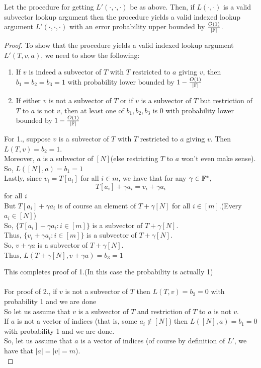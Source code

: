 \begin{lemma}\label{lem:reduction}
Let the procedure for getting $L'(\cdot, \cdot, \cdot)$ be as above. Then, if $L(\cdot, \cdot)$ is a valid subvector lookup argument then the procedure yields a valid indexed lookup argument $L'(\cdot, \cdot, \cdot)$ with an error probability upper bounded by $\frac{O(1)}{|\mathbb{F}|}$.
\end{lemma}

\begin{proof}
    To show that the procedure yields a valid indexed lookup argument $L'(T, v, a)$, we need to show the following:
    \begin{enumerate}

        \item If $v$ is indeed a subvector of $T$ with $T$ restricted to $a$ giving $v$, then $b_1=b_2=b_3=1$ with probability lower bounded by $1-\frac{O(1)}{|\mathbb{F}|}$
        \item If either $v$ is not a subvector of $T$ or if $v$ is a subvector of $T$ but restriction of $T$ to $a$ is not $v$, then at least one of $b_1, b_2, b_3$ is $0$ with probability lower bounded by $1-\frac{O(1)}{|\mathbb{F}|}$
    \end{enumerate}

    For 1., suppose $v$ is a subvector of $T$ with $T$ restricted to $a$ giving $v$. Then $L(T, v)=b_2=1$. \\
    Moreover, $a$ is a subvector of $[N]$(else restricting $T$ to $a$ won't even make sense). \\
    So, $L([N], a)=b_1=1$ \\
    Lastly, since $v_i=T[a_i]$ for all $i \in m$, we have that for any $\gamma \in \mathbb{F}^{*}$,
    $$T[a_i]+\gamma a_i=v_i+\gamma a_i$$ for all $i$ \\
    But $T[a_i]+\gamma a_i$ is of course an element of $T+\gamma [N] $ for all $i \in [m]$.(Every $a_i \in [N]$)\\
    So, $\{T[a_i]+\gamma a_i:i \in [m]\}$ is a subvector of $T+\gamma [N] $.\\
    Thus, $\{v_i+\gamma a_i:i \in [m]\}$ is a subvector of $T+\gamma [N] $.\\
    So, $v+\gamma a$ is a subvector of $T+\gamma [N] $.\\
    Thus, $L(T+\gamma[N], v+\gamma a)=b_3=1$

    This completes proof of 1.(In this case the probability is actually 1) \\\\
    For proof of 2., if $v$ is not a subvector of $T$ then $L(T, v)=b_2=0$ with probability 1 and we are done \\
    So let us assume that $v$ is a subvector of $T$ and restriction of $T$ to $a$ is not $v$.\\
    If $a$ is not a vector of indices (that is, some $a_i \notin [N]$) then $L([N], a)=b_1=0$ with probability 1 and we are done. \\
    So, let us assume that $a$ is a vector of indices (of course by definition of $L'$, we have that $|a|=|v|=m$).\\


\end{proof}
